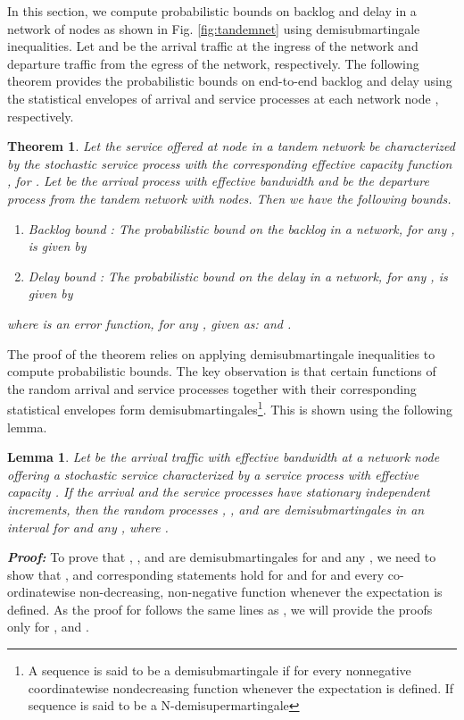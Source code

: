\documentclass[letterpaper]{IEEEtran}
\newtheorem{theorem}{Theorem}[section]
\newtheorem{lemma}{Lemma}[section]
\begin{document}
In this section, we compute probabilistic bounds on backlog and delay in a network of  nodes as shown in Fig. \ref{fig:tandemnet} using demisubmartingale inequalities. Let  and  be the arrival traffic at the ingress of the network and departure traffic from the egress of the network, respectively.  
The following theorem provides the probabilistic bounds on end-to-end backlog and delay using the statistical envelopes of arrival and service processes at each network node , respectively. 
\begin{theorem}
\label{theorem:pbr}
Let the service offered at node  in a tandem network be characterized by the stochastic service process  with the corresponding effective capacity function , for . Let  be the arrival process with effective bandwidth  and  be the departure process from the tandem network with  nodes. Then we have the following bounds.
\begin{enumerate}
	\item Backlog bound : The probabilistic bound on the backlog in a network, for any , is given by
					
	\item Delay bound : The probabilistic bound on the delay in a network, for any , is given by
				
\end{enumerate}
where   is an error function, for any , given as: 
\small	
 and .
\normalsize
\end{theorem}
The proof of the theorem relies on applying demisubmartingale inequalities to compute probabilistic bounds. The key observation is that certain functions of the random arrival and service processes together with their corresponding statistical envelopes form demisubmartingales\footnote{A  sequence  is said  to  be  a  demisubmartingale  if   for  every nonnegative  coordinatewise  nondecreasing function  whenever the expectation is defined. If  sequence  is said  to  be  a  N-demisupermartingale}. This is shown using the following lemma.
\begin{lemma}
\label{lemma:demi}
Let  be the arrival traffic with effective bandwidth  at a network node offering a stochastic service characterized by a service process  with effective capacity . If the arrival and the service processes have stationary independent increments, then the random processes , ,   and  are demisubmartingales in an interval  for  and any , where . 
\end{lemma}
\textbf{\textit{Proof:}} To prove that , ,  and  are demisubmartingales \cite{chris:2003,rao:2007} for  and any  , we need to show that , and corresponding statements hold for  and  for  and every co-ordinatewise non-decreasing, non-negative function  whenever the expectation is defined. As the proof for  follows the same lines as , we will provide the proofs only for ,  and .
\small
\end{document}
